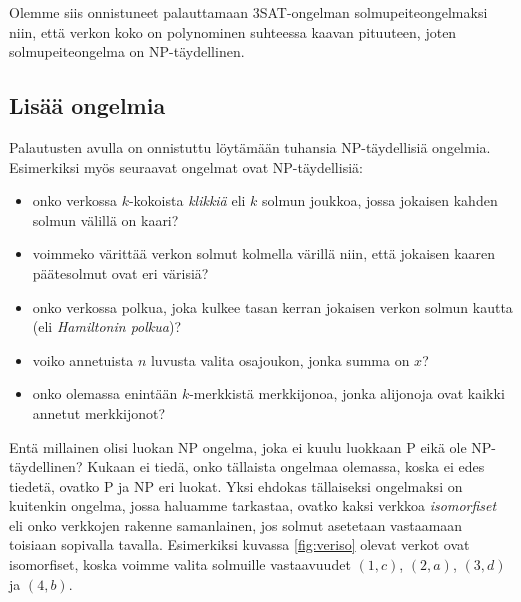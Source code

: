 Olemme siis onnistuneet palauttamaan 3SAT-ongelman solmupeiteongelmaksi
niin, että verkon koko on polynominen suhteessa kaavan pituuteen,
joten solmupeiteongelma on NP-täydellinen.

\subsection{Lisää ongelmia}

Palautusten avulla on onnistuttu löytämään tuhansia NP-täydellisiä ongelmia.
Esimerkiksi myös seuraavat ongelmat ovat NP-täydellisiä:

\begin{itemize}
\item onko verkossa $k$-kokoista \emph{klikkiä} eli $k$ solmun joukkoa,
jossa jokaisen kahden solmun välillä on kaari?
\item voimmeko värittää verkon solmut kolmella värillä niin,
että jokaisen kaaren päätesolmut ovat eri värisiä?
\item onko verkossa polkua, joka kulkee tasan kerran jokaisen
verkon solmun kautta (eli \emph{Hamiltonin polkua})?
\item voiko annetuista $n$ luvusta valita osajoukon, jonka summa on $x$?
\item onko olemassa enintään $k$-merkkistä merkkijonoa,
jonka alijonoja ovat kaikki annetut merkkijonot?
\end{itemize}

Entä millainen olisi luokan NP ongelma, joka ei kuulu luokkaan P
eikä ole NP-täydellinen?
Kukaan ei tiedä, onko tällaista ongelmaa olemassa,
koska ei edes tiedetä, ovatko P ja NP eri luokat.
Yksi ehdokas tällaiseksi ongelmaksi on kuitenkin ongelma,
jossa haluamme tarkastaa,
ovatko kaksi verkkoa \emph{isomorfiset} eli
onko verkkojen rakenne samanlainen,
jos solmut asetetaan vastaamaan toisiaan sopivalla tavalla.
Esimerkiksi kuvassa \ref{fig:veriso} olevat verkot ovat isomorfiset,
koska voimme valita solmuille vastaavuudet $(1,c)$, $(2,a)$, $(3,d)$ ja $(4,b)$.

